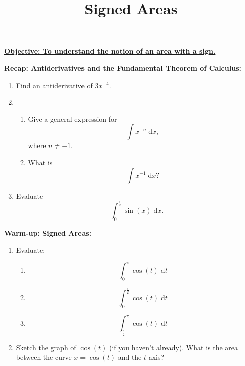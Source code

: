 \documentclass{article}
\newcommand{\diff}{\;\mathrm{d}}
\begin{document}
\title{Signed Areas}
\date{}

\maketitle
\thispagestyle{empty}

\Large

\textbf{\underline{Objective: To understand the notion of an area with a sign.}}






\vspace{5mm}



\textbf{Recap: Antiderivatives and the Fundamental Theorem of Calculus:}\bigskip


\begin{enumerate}
	\item Find an antiderivative of $3x^{-4}$.
	\item
		\begin{enumerate}
			\item Give a general expression for
				\[\int x^{-n}\diff x,\]
				where $n\neq -1$.
			\item What is
				\[\int x^{-1}\diff x?\]
		\end{enumerate}
	\item Evaluate
		\[\int_0^\frac{\pi}{2} \sin(x)\diff x.\]
\end{enumerate}






\clearpage


\textbf{Warm-up: Signed Areas:}\bigskip



\begin{enumerate}
	\item Evaluate:
		\begin{enumerate}
			\item
				\[\int_0^\pi \cos(t)\diff t\]
			\item
				\[\int_0^\frac{\pi}{2}\cos(t)\diff t\]
			\item
				\[\int_\frac{\pi}{2}^\pi \cos(t)\diff t\]
		\end{enumerate}
	\item Sketch the graph of $\cos(t)$ (if you haven't already). What is the area between the curve $x=\cos(t)$ and the $t$-axis?
\end{enumerate}
\end{document}
